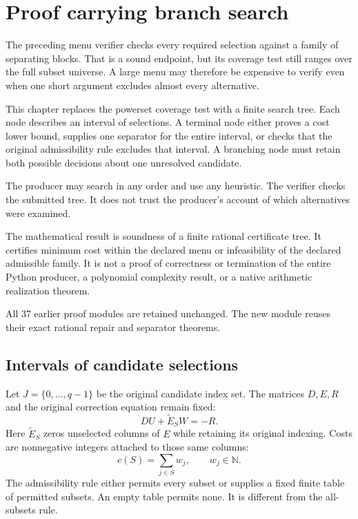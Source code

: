 \documentclass[11pt,letterpaper,oneside,openany]{book}
\theoremstyle{quiet}
\newcommand{\N}{\mathbb{N}}
\begin{document}
\chapter{Proof carrying branch search}
\label{ch:branch-search}

The preceding menu verifier checks every required selection against a family of separating blocks. That is a sound endpoint, but its coverage test still ranges over the full subset universe. A large menu may therefore be expensive to verify even when one short argument excludes almost every alternative.

This chapter replaces the powerset coverage test with a finite search tree. Each node describes an interval of selections. A terminal node either proves a cost lower bound, supplies one separator for the entire interval, or checks that the original admissibility rule excludes that interval. A branching node must retain both possible decisions about one unresolved candidate.

The producer may search in any order and use any heuristic. The verifier checks the submitted tree. It does not trust the producer's account of which alternatives were examined.

\begin{scopebox}[title=The new verified boundary]
The mathematical result is soundness of a finite rational certificate tree. It certifies minimum cost within the declared menu or infeasibility of the declared admissible family. It is not a proof of correctness or termination of the entire Python producer, a polynomial complexity result, or a native arithmetic realization theorem.

All 37 earlier proof modules are retained unchanged. The new module reuses their exact rational repair and separator theorems.
\end{scopebox}

\section{Intervals of candidate selections}

Let $J=\{0,\ldots,q-1\}$ be the original candidate index set. The matrices $D,E,R$ and the original correction equation remain fixed:
\[
 DU+\widetilde E_S W=-R.
\]
Here $\widetilde E_S$ zeros unselected columns of $E$ while retaining its original indexing. Costs are nonnegative integers attached to those same columns:
\[
 c(S)=\sum_{j\in S}w_j,\qquad w_j\in\N.
\]
The admissibility rule either permits every subset or supplies a fixed finite table of permitted subsets. An empty table permits none. It is different from the all-subsets rule.
\end{document}
